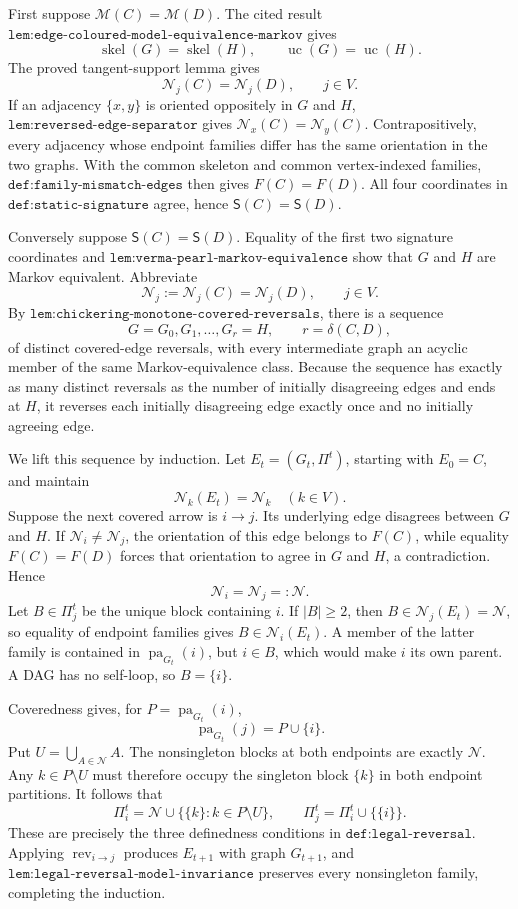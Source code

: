 First suppose \(\mathcal M(C)=\mathcal M(D)\). The cited result \(\texttt{lem:edge-coloured-model-equivalence-markov}\) gives
\[
 \operatorname{skel}(G)=\operatorname{skel}(H),
 \qquad
 \operatorname{uc}(G)=\operatorname{uc}(H).
\]
The proved tangent-support lemma gives
\[
 \mathcal N_j(C)=\mathcal N_j(D),\qquad j\in V.
\]
If an adjacency \(\{x,y\}\) is oriented oppositely in \(G\) and \(H\), \(\texttt{lem:reversed-edge-separator}\) gives \(\mathcal N_x(C)=\mathcal N_y(C)\). Contrapositively, every adjacency whose endpoint families differ has the same orientation in the two graphs. With the common skeleton and common vertex-indexed families, \(\texttt{def:family-mismatch-edges}\) then gives \(F(C)=F(D)\). All four coordinates in \(\texttt{def:static-signature}\) agree, hence \(\mathsf S(C)=\mathsf S(D)\).

Conversely suppose \(\mathsf S(C)=\mathsf S(D)\). Equality of the first two signature coordinates and \(\texttt{lem:verma-pearl-markov-equivalence}\) show that \(G\) and \(H\) are Markov equivalent. Abbreviate
\[
 \mathcal N_j:=\mathcal N_j(C)=\mathcal N_j(D),\qquad j\in V.
\]
By \(\texttt{lem:chickering-monotone-covered-reversals}\), there is a sequence
\[
 G=G_0,G_1,\ldots,G_r=H,
 \qquad r=\delta(C,D),
\]
of distinct covered-edge reversals, with every intermediate graph an acyclic member of the same Markov-equivalence class. Because the sequence has exactly as many distinct reversals as the number of initially disagreeing edges and ends at \(H\), it reverses each initially disagreeing edge exactly once and no initially agreeing edge.

We lift this sequence by induction. Let \(E_t=(G_t,\Pi^t)\), starting with \(E_0=C\), and maintain
\[
 \mathcal N_k(E_t)=\mathcal N_k\quad(k\in V).
\]
Suppose the next covered arrow is \(i\to j\). Its underlying edge disagrees between \(G\) and \(H\). If \(\mathcal N_i\neq\mathcal N_j\), the orientation of this edge belongs to \(F(C)\), while equality \(F(C)=F(D)\) forces that orientation to agree in \(G\) and \(H\), a contradiction. Hence
\[
 \mathcal N_i=\mathcal N_j=:\mathcal N.
\]
Let \(B\in\Pi^t_j\) be the unique block containing \(i\). If \(|B|\geq2\), then \(B\in\mathcal N_j(E_t)=\mathcal N\), so equality of endpoint families gives \(B\in\mathcal N_i(E_t)\). A member of the latter family is contained in \(\operatorname{pa}_{G_t}(i)\), but \(i\in B\), which would make \(i\) its own parent. A DAG has no self-loop, so \(B=\{i\}\).

Coveredness gives, for \(P=\operatorname{pa}_{G_t}(i)\),
\[
 \operatorname{pa}_{G_t}(j)=P\cup\{i\}.
\]
Put \(U=\bigcup_{A\in\mathcal N}A\). The nonsingleton blocks at both endpoints are exactly \(\mathcal N\). Any \(k\in P\setminus U\) must therefore occupy the singleton block \(\{k\}\) in both endpoint partitions. It follows that
\[
 \Pi^t_i=\mathcal N\cup\{\{k\}:k\in P\setminus U\},
 \qquad
 \Pi^t_j=\Pi^t_i\cup\{\{i\}\}.
\]
These are precisely the three definedness conditions in \(\texttt{def:legal-reversal}\). Applying \(\operatorname{rev}_{i\to j}\) produces \(E_{t+1}\) with graph \(G_{t+1}\), and \(\texttt{lem:legal-reversal-model-invariance}\) preserves every nonsingleton family, completing the induction.

